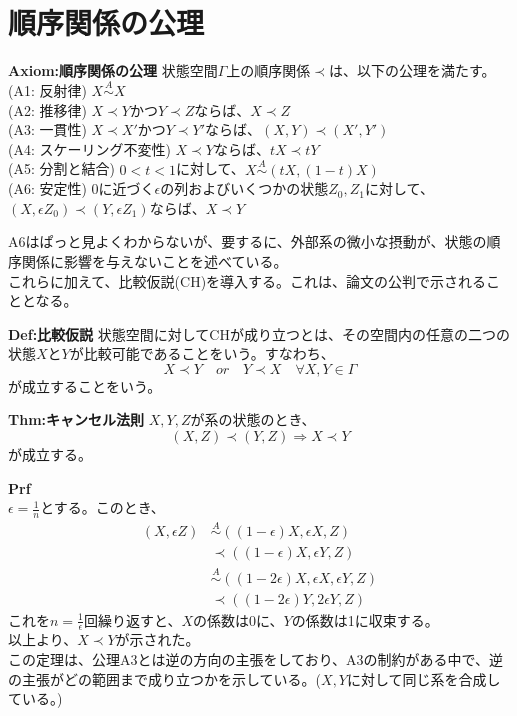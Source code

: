 \documentclass[a4paper,11pt]{jsarticle}
\begin{document}
\section{順序関係の公理}
\begin{itembox}[l]{\textbf{Axiom:順序関係の公理}}
    状態空間$\Gamma$上の順序関係$\prec$は、以下の公理を満たす。\\
    (A1: 反射律) $ X \overset{A}{\sim} X$\\
    (A2: 推移律) $X \prec Y$かつ$Y \prec Z$ならば、$X \prec Z$\\
    (A3: 一貫性) $X \prec X'$かつ$Y \prec Y'$ならば、$(X,Y) \prec (X',Y')$\\
    (A4: スケーリング不変性) $X \prec Y$ならば、$tX \prec tY$\\
    (A5: 分割と結合) $0<t<1$に対して、$X \overset{A}{\sim} (tX,(1-t)X)$\\
    (A6: 安定性) 0に近づく$\epsilon$の列およびいくつかの状態$Z_0,Z_1$に対して、$(X,\epsilon Z_0) \prec (Y,\epsilon Z_1)$ならば、$X \prec Y$ 
\end{itembox}
A6はぱっと見よくわからないが、要するに、外部系の微小な摂動が、状態の順序関係に影響を与えないことを述べている。\\
これらに加えて、比較仮説(CH)を導入する。これは、論文の公判で示されることとなる。\\
\begin{itembox}[l]{\textbf{Def:比較仮説}}
    状態空間に対してCHが成り立つとは、その空間内の任意の二つの状態$X$と$Y$が比較可能であることをいう。すなわち、
    \begin{equation}
        X \prec Y \quad or \quad Y \prec X \quad \forall X,Y \in \Gamma
    \end{equation}
    が成立することをいう。

\end{itembox}

\begin{itembox}[l]{\textbf{Thm:キャンセル法則}}
    $X,Y,Z$が系の状態のとき、
    \begin{equation}
        (X,Z) \prec (Y,Z) \Rightarrow X \prec Y
    \end{equation}
    が成立する。

\end{itembox}
\textbf{Prf}\\
$\epsilon =\frac{1}{n}$とする。このとき、
\begin{align}
    (X,\epsilon Z) &\overset{A}{\sim} ((1-\epsilon)X,\epsilon X,Z)\\
    &\prec ((1-\epsilon)X,\epsilon Y,Z)\\
    &\overset{A}{\sim} ((1-2\epsilon)X,\epsilon X,\epsilon Y,Z)\\
    &\prec ((1-2\epsilon)Y,2\epsilon Y,Z)
    \end{align}
これを$n=\frac{1}{\epsilon}$回繰り返すと、$X$の係数は0に、$Y$の係数は1に収束する。\\
以上より、$X \prec Y$が示された。\qedsymbol\\
この定理は、公理A3とは逆の方向の主張をしており、A3の制約がある中で、逆の主張がどの範囲まで成り立つかを示している。($X,Y$に対して同じ系を合成している。)
\end{document}
